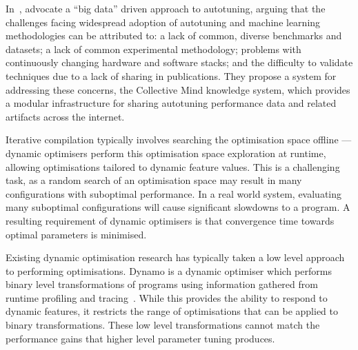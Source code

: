 In~\cite{Saclay2010,Memon2013,Fursin2014}, \citeauthor{Fursin2014} advocate a ``big data'' driven approach to autotuning, arguing that the challenges facing widespread adoption of autotuning and machine learning methodologies can be attributed to: a lack of common, diverse benchmarks and datasets; a lack of common experimental methodology; problems with continuously changing hardware and software stacks; and the difficulty to validate techniques due to a lack of sharing in publications. They propose a system for addressing these concerns, the Collective Mind knowledge system, which provides a modular infrastructure for sharing autotuning performance data and related artifacts across the internet.


Iterative compilation typically involves searching the optimisation space offline --- dynamic optimisers perform this optimisation space exploration at runtime, allowing optimisations tailored to dynamic feature values. This is a challenging task, as a random search of an optimisation space may result in many configurations with suboptimal performance. In a real world system, evaluating many suboptimal configurations will cause significant slowdowns to a program. A resulting requirement of dynamic optimisers is that convergence time towards optimal parameters is minimised.

Existing dynamic optimisation research has typically taken a low level approach to performing optimisations. Dynamo is a dynamic optimiser which performs binary level transformations of programs using information gathered from runtime profiling and tracing~\cite{Bala2000}. While this provides the ability to respond to dynamic features, it restricts the range of optimisations that can be applied to binary transformations. These low level transformations cannot match the performance gains that higher level parameter tuning produces.

